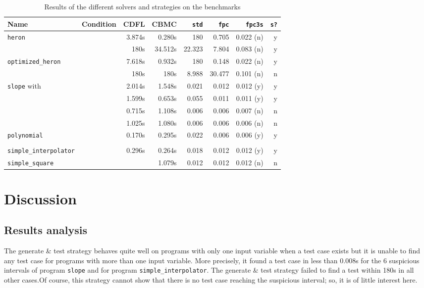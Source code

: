 \documentclass[a4paper]{llncs}
\newcommand{\CBMC}{\textsc{CBMC}}
\newcommand{\CDFL}{\textsc{CDFL}}
\begin{document}
\begin{table*}[t]
\begin{center}
\begin {tabular}{|l||l||r|r|r|r|r|r|}
\hline
Name & Condition & \CDFL{} & \CBMC{} & \lstinline|std| & \lstinline|fpc| & \lstinline|fpc3s| & \lstinline|s?| \\
\hline
\hline
{\lstinline|heron|} &   & 3.874s & 0.280s &   180 & 0.705 &  0.022 (n) & y \\
 &   &  180s & 34.512s &  22.323 & 7.804 & 0.083 (n) & y \\ 
\hline
{\lstinline|optimized_heron|}  &   & 7.618s & 0.932s &   180 & 0.148 & 0.022 (n) & y \\
   &   &  180s &  180s &  8.988 &
                                                                     30.477
                                                 & 0.101 (n) & n \\

\hline 
{\lstinline|slope|} with &  &  2.014s & 1.548s & 0.021 & 0.012 & 0.012 (y) & y\\
  &  & 1.599s & 0.653s & 0.055 & 0.011 & 0.011 (y) & y \\
 &   & 0.715s & 1.108s & 0.006 & 0.006 & 0.007 (n) & n \\
 &   & 1.025s & 1.080s & 0.006 & 0.006 & 0.006 (n) & n \\
\hline


{\lstinline|polynomial|}   &  & 0.170s & 0.295s &  0.022 &  0.006 & 0.006 (y) & y \\
 & \hfill & & & & & & \\
\hline
{\lstinline|simple_interpolator|}   &  & 0.296s & 0.264s &  0.018 & 0.012 & 0.012 (y) & y \\\hline
{\lstinline|simple_square|}  &  &  & 1.079s &  0.012 & 0.012 & 0.012 (n) & n \\
\hline 
\end {tabular}

\caption{Results of the different solvers and strategies on the benchmarks}
\label{times}
\end{center}

\end{table*}

\section{Discussion}
\subsection{ Results analysis } 
\label{sec:discussion}
The generate \& test strategy behaves quite well on programs with only
one input variable when a test case exists but it is unable to find
any test case for programs with more than one input variable.  More
precisely, it found a test case in less than 0.008s for the 6 suspicious intervals of program \lstinline|slope| and for program \lstinline|simple_interpolator|.
The generate \& test strategy  failed to find a test within 180s in
all other cases.Of course, this strategy cannot show that there is no test case reaching the suspicious interval; so, it is of little interest here.
\end{document}
